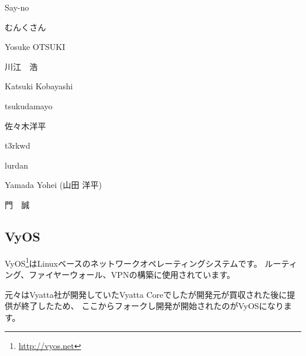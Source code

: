 \documentclass[mingoth,a4paper]{jsarticle}
\begin{document}
\begin{prework}{ Say-no }
\end{prework}

\begin{prework}{ むんくさん }
\end{prework}

\begin{prework}{ Yosuke OTSUKI }
\end{prework}

\begin{prework}{ 川江　浩 }
\end{prework}

\begin{prework}{ Katsuki Kobayashi }
\end{prework}

\begin{prework}{ tsukudamayo }
\end{prework}

\begin{prework}{ 佐々木洋平 }
\end{prework}

\begin{prework}{ t3rkwd }
\end{prework}

\begin{prework}{ lurdan }
\end{prework}

\begin{prework}{ Yamada Yohei (山田 洋平) }
\end{prework}

\begin{prework}{ 門　誠 }
\end{prework}





\subsection{VyOS}

VyOS\footnote{\url{http://vyos.net}}はLinuxベースのネットワークオペレーティングシステムです。
ルーティング、ファイヤーウォール、VPNの構築に使用されています。

元々はVyatta社が開発していたVyatta Coreでしたが開発元が買収された後に提供が終了したため、
ここからフォークし開発が開始されたのがVyOSになります。
\end{document}
